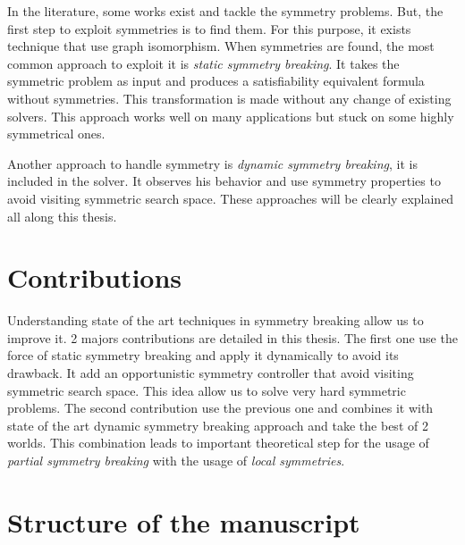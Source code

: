 In the literature, some works exist and tackle the symmetry problems.
But, the first step to exploit symmetries is to find them. For this purpose, it exists technique 
that use graph isomorphism.
When symmetries are found, the most common approach to exploit it is \emph{static symmetry breaking}.
It takes the symmetric problem as input and produces a satisfiability equivalent formula without symmetries. This transformation is made without any change of existing solvers. This approach works 
well on many applications but stuck on some highly symmetrical ones.

Another approach to handle symmetry is \emph{dynamic symmetry breaking}, it is included in the solver. It observes his behavior and use symmetry properties to avoid visiting symmetric search space.
These approaches will be clearly explained all along this thesis.


\section{Contributions}

Understanding state of the art techniques in symmetry breaking allow us to improve it.
2 majors contributions are detailed in this thesis. The first one use the force of static symmetry 
breaking and apply it dynamically to avoid its drawback. It add an opportunistic symmetry controller 
that avoid visiting symmetric search space. This idea allow us to solve very hard symmetric problems.
 The second contribution use the previous one and combines it with state of the art dynamic 
 symmetry breaking approach and take the best of 2 worlds. This combination leads to 
 important theoretical step for the usage of \emph{partial symmetry breaking} with the usage of 
 \emph{local symmetries}. 
 

\section{Structure of the manuscript}



